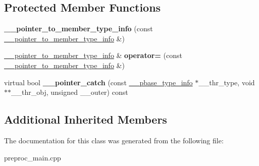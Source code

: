 \subsection*{Protected Member Functions}
\begin{DoxyCompactItemize}
\item 
\hypertarget{class____cxxabiv1_1_1____pointer__to__member__type__info_af33d1633593021103484e4fbf201daab}{{\bfseries \+\_\+\+\_\+pointer\+\_\+to\+\_\+member\+\_\+type\+\_\+info} (const \hyperlink{class____cxxabiv1_1_1____pointer__to__member__type__info}{\+\_\+\+\_\+pointer\+\_\+to\+\_\+member\+\_\+type\+\_\+info} \&)}\label{class____cxxabiv1_1_1____pointer__to__member__type__info_af33d1633593021103484e4fbf201daab}

\item 
\hypertarget{class____cxxabiv1_1_1____pointer__to__member__type__info_aac234f4e0a0547e90a64f771a72195d7}{\hyperlink{class____cxxabiv1_1_1____pointer__to__member__type__info}{\+\_\+\+\_\+pointer\+\_\+to\+\_\+member\+\_\+type\+\_\+info} \& {\bfseries operator=} (const \hyperlink{class____cxxabiv1_1_1____pointer__to__member__type__info}{\+\_\+\+\_\+pointer\+\_\+to\+\_\+member\+\_\+type\+\_\+info} \&)}\label{class____cxxabiv1_1_1____pointer__to__member__type__info_aac234f4e0a0547e90a64f771a72195d7}

\item 
\hypertarget{class____cxxabiv1_1_1____pointer__to__member__type__info_a3f3da71b6dadf2ff4f300e20a3e2c75c}{virtual bool {\bfseries \+\_\+\+\_\+pointer\+\_\+catch} (const \hyperlink{class____cxxabiv1_1_1____pbase__type__info}{\+\_\+\+\_\+pbase\+\_\+type\+\_\+info} $\ast$\+\_\+\+\_\+thr\+\_\+type, void $\ast$$\ast$\+\_\+\+\_\+thr\+\_\+obj, unsigned \+\_\+\+\_\+outer) const }\label{class____cxxabiv1_1_1____pointer__to__member__type__info_a3f3da71b6dadf2ff4f300e20a3e2c75c}

\end{DoxyCompactItemize}
\subsection*{Additional Inherited Members}


The documentation for this class was generated from the following file\+:\begin{DoxyCompactItemize}
\item 
preproc\+\_\+main.\+cpp\end{DoxyCompactItemize}
